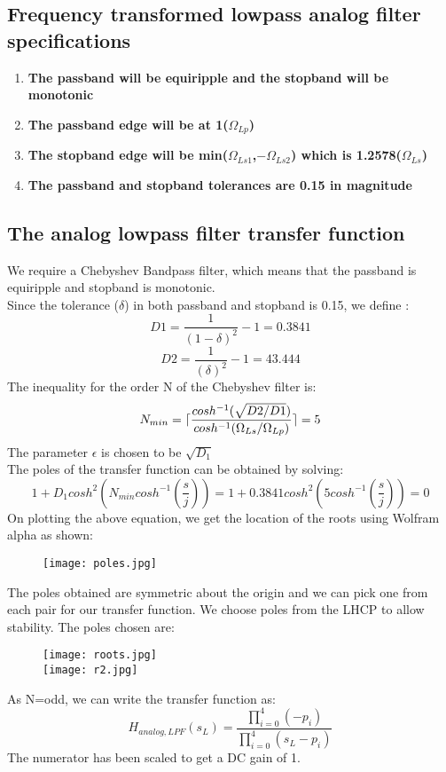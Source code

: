 \documentclass[12pt]{article}
\DeclarePairedDelimiter\ceil{\lceil}{\rceil}
\begin{document}
\subsection{Frequency transformed lowpass analog filter specifications}
\begin{enumerate}
    \item \textbf{The passband will be equiripple and the stopband will be monotonic}
    \item \textbf{The passband edge will be at 1($\Omega_{Lp}$)}
    \item \textbf{The stopband edge will be min($\Omega_{Ls1}$,$-\Omega_{Ls2}$) which is 1.2578($\Omega_{Ls}$)}
    \item \textbf{The passband and stopband tolerances are 0.15 in magnitude}

\end{enumerate}
\newpage
\subsection{The analog lowpass filter transfer function}
We require a Chebyshev Bandpass filter, which means that  the passband is equiripple and stopband is monotonic.
\\Since the tolerance ($\delta$) in both passband and stopband is 0.15, we define :
\begin{equation}
    D1= \frac{1}{(1-\delta)^2}-1 = 0.3841
\end{equation}
\begin{equation}
    D2= \frac{1}{(\delta)^2}-1 = 43.444
\end{equation}
The inequality for the order N of the Chebyshev filter is:
\begin{equation}
    N_{min}=\ceil{\frac{cosh^{-1}(\sqrt{D2/D1})}{cosh^{-1}(\Omega_{Ls}/\Omega_{Lp})}} = 5
\end{equation}
The parameter $\epsilon$ is chosen to be $\sqrt{D_1}$
\\The poles of the transfer function can be obtained by solving:
\begin{equation}
   1+ D_1cosh^2(N_{min}cosh^{-1}(\frac{s}{j})) = 1+ 0.3841cosh^2(5cosh^{-1}(\frac{s}{j})) = 0
\end{equation}
On plotting the above equation, we get the location of the roots using Wolfram alpha as shown:
\begin{figure}[H]
    \centering
    \texttt{[image: poles.jpg]}
\end{figure}

The poles obtained are symmetric about the origin and we can pick one from each pair for our transfer function. We choose poles from the LHCP to allow stability. 
\newpage
The poles chosen are:
\begin{figure}[H]
    \centering
    \texttt{[image: roots.jpg]}
   \\ \texttt{[image: r2.jpg]}
\end{figure}
As N=odd, we can write the transfer function as:
\begin{equation}
    H_{analog,LPF}(s_L)=\frac{\prod_{i=0}^{4}(-p_i)}{\prod_{i=0}^{4
    }(s_L-p_i)}
\end{equation}
The numerator has been scaled to get a DC gain of 1.
\end{document}
